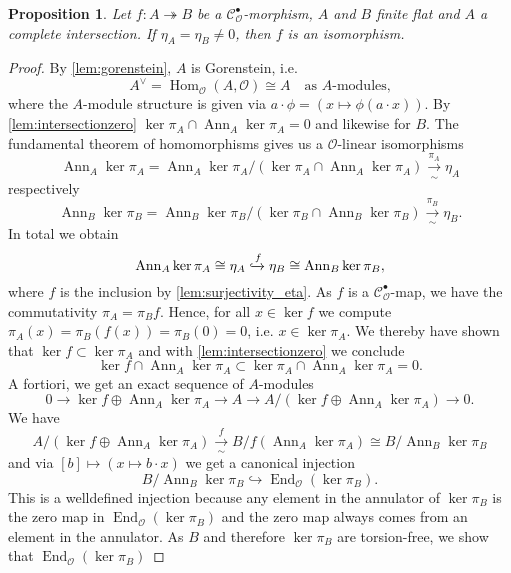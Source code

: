 \documentclass{article}
\theoremstyle{plain}%
\newtheorem{proposition}[theorem]{Proposition}
\theoremstyle{definition}
\theoremstyle{remark}
\newcommand{\cob}{\mathcal{C}_\mathcal{O}^\bullet}
\newcommand{\ann}{\operatorname{Ann}}
\renewcommand{\hom}{\operatorname{Hom}}
\begin{document}
\begin{proposition}\textup{\cite[theorem 5.24]{Darmon1995}}\label{prop:eta_iso}
    Let \(f\colon A \twoheadrightarrow B\) be a \(\cob\)-morphism, \(A\) and \(B\) finite flat and \(A\) a 
    complete intersection. If \(\eta_A = \eta_B \neq 0\), then \(f\) is an isomorphism.
\end{proposition}
\begin{proof}
    By \cref{lem:gorenstein}, \(A\) is Gorenstein, i.e.
    \[
        A^\vee = \hom_\mathcal{O}(A, \mathcal{O}) \cong A \quad \text{as \(A\)-modules,} 
    \]
    where the \(A\)-module structure is given via \(a \cdot \phi = (x \mapsto \phi(a\cdot x))\).
    By \cref{lem:intersectionzero} \(\ker \pi_A \cap \ann_A \ker \pi_A = 0\) and likewise for \(B\).
    The fundamental theorem of homomorphisms gives us a \(\mathcal{O}\)-linear isomorphisms
    \[
        \ann_A \ker \pi_A = \ann_A \ker \pi_A/(\ker \pi_A \cap \ann_A \ker \pi_A) \xrightarrow[\sim]{\pi_A} \eta_A
    \]
    respectively
    \[
        \ann_B \ker \pi_B = \ann_B \ker \pi_B/(\ker \pi_B\cap \ann_B \ker \pi_B) \xrightarrow[\sim]{\pi_B} \eta_B.
    \]
    In total we obtain
    \[
        \ann_A \ker \pi_A \cong \eta_A \xhookrightarrow{f} \eta_B \cong \ann_B \ker \pi_B,
    \]
    where \(f\) is the inclusion by \cref{lem:surjectivity_eta}.
    As \(f\) is a \(\cob\)-map, we have the commutativity \(\pi_A = \pi_Bf\). Hence, for all \(x\in \ker f\)
    we compute \(\pi_A(x) = \pi_B(f(x)) = \pi_B(0) = 0\), i.e. \(x \in \ker \pi_A\). We thereby have shown 
    that \(\ker f \subset \ker \pi_A\) and with \cref{lem:intersectionzero} we conclude
    \[
        \ker f \cap \ann_A \ker \pi_A \subset \ker \pi_A \cap \ann_A \ker \pi_A = 0.
    \]
    A fortiori, we get an exact sequence of \(A\)-modules
    \[
        0 \longrightarrow \ker f \oplus \ann_A \ker \pi_A \longrightarrow A 
        \longrightarrow A/(\ker f \oplus \ann_A \ker \pi_A)  \longrightarrow 0.
        \tag{\textasteriskcentered} \label{eq:ses}
    \]
    We have
    \[
        A/(\ker f \oplus \ann_A \ker \pi_A) \xrightarrow[\sim]{f} B/f(\ann_A \ker \pi_A) \cong B/\ann_B \ker \pi_B
    \]
    and via \([b] \mapsto (x \mapsto b\cdot x)\) we get a canonical injection
    \[
        B/\ann_B \ker \pi_B \hookrightarrow \operatorname{End}_\mathcal{O}(\ker \pi_B).
    \]
    This is a welldefined injection because any element in the annulator of \(\ker \pi_B\) is the zero map
    in \(\operatorname{End}_\mathcal{O}(\ker \pi_B)\) and the zero map always comes from an element in the annulator.
    As \(B\) and therefore \(\ker \pi_B\) are torsion-free, we show that \(\operatorname{End}_\mathcal{O}(\ker \pi_B)\)

\end{proof}
\end{document}
